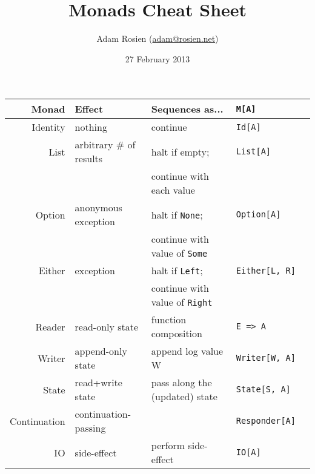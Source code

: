 \documentclass{tufte-handout}
\title{Monads Cheat Sheet}
\author[Adam Rosien]{Adam Rosien (\href{mailto:adam@rosien.net}{adam@rosien.net})}
\date{27 February 2013}  %
\begin{document}
\maketitle%


\begin{table}[ht]
  \centering
  \selectfont
  \begin{tabular}{rllll}
    \toprule
    Monad        & Effect\footnotemark[1]  & Sequences as...                & \texttt{M[A]} \\ 
    \midrule
    Identity     & nothing                 & continue                       & \texttt{Id[A]} \\
    List         & arbitrary \# of results & halt if empty;                 & \texttt{List[A]} \\
                 &                         & continue with each value       & \\
    Option       & anonymous exception     & halt if \texttt{None};         & \texttt{Option[A]} \\
                 &                         & continue with value of \texttt{Some} & \\
    Either       & exception               & halt if \texttt{Left};         & \texttt{Either[L, R]} \\
                 &                         & continue with value of \texttt{Right} & \\
    Reader       & read-only state         & function composition           & \texttt{E => A} \\
    Writer       & append-only state       & append log value W             & \texttt{Writer[W, A]} \\
    State        & read+write state        & pass along the (updated) state & \texttt{State[S, A]} \\
    Continuation & continuation-passing    &                                & \texttt{Responder[A]} \\
    IO           & side-effect\footnotemark[2] & perform side-effect        & \texttt{IO[A]} \\
    \bottomrule
  \end{tabular}
  \label{tab:normaltab}
\end{table}

\end{document}
